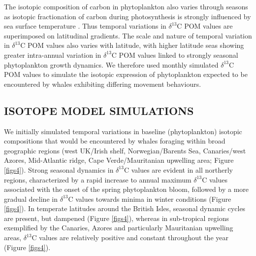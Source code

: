 \documentclass[a4paper,10pt]{article}
\begin{document}
The isotopic composition of carbon in phytoplankton also varies through seasons as isotopic fractionation of carbon during photosynthesis is strongly influenced by sea surface temperature \citep{laws1995dependence}. 
Thus temporal variations in $\delta^{13}$C POM values are superimposed on latitudinal gradients. 
The scale and nature of temporal variation in $\delta^{13}$C POM values also varies with latitude, with higher latitude seas showing greater intra-annual variation in $\delta^{13}$C POM values linked to strongly seasonal phytoplankton growth dynamics. 
We therefore used monthly simulated $\delta^{13}$C POM values to simulate the isotopic expression of phytoplankton expected to be encountered by whales exhibiting differing movement behaviours.
 
\subsection*{ISOTOPE MODEL SIMULATIONS}
We initially simulated temporal variations in baseline (phytoplankton) isotopic compositions that would be encountered by whales foraging within broad geographic regions (west UK/Irish shelf, Norwegian/Barents Sea, Canaries/west Azores, Mid-Atlantic ridge, Cape Verde/Mauritanian upwelling area; Figure \ref{figs4}). 
Strong seasonal dynamics in $\delta^{13}$C values are evident in all northerly regions, characterized by a rapid increase to annual maximum $\delta^{13}$C values associated with the onset of the spring phytoplankton bloom, followed by a more gradual decline in $\delta^{13}$C values towards minima in winter conditions (Figure \ref{figs4}). 
In temperate latitudes around the British Isles, seasonal dynamic cycles are present, but dampened (Figure \ref{figs4}), whereas in sub-tropical regions exemplified by the Canaries, Azores and particularly Mauritanian upwelling areas, $\delta^{13}$C values are relatively positive and constant throughout the year (Figure \ref{figs4}).
 
\end{document}
